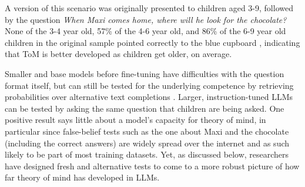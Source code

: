 \noindent
A version of this scenario was originally presented to children aged 3-9, followed by the question {\em When Maxi comes home, where will he look for the chocolate?} None of the 3-4 year old, 57\% of the 4-6 year old, and 86\% of the 6-9 year old children in the original sample pointed correctly to the blue cupboard \citep{wimmer1983beliefs}, indicating that ToM is better developed as children get older, on average. 

Smaller and base models before fine-tuning have difficulties with the question format itself, but can still be tested for the underlying competence by retrieving probabilities over alternative text completions \citep{kouwenhoven2026traces}. Larger, instruction-tuned LLMs can be tested by asking the same question that children are being asked. 
One positive result says little about a model's capacity for theory of mind, in particular since false-belief tests such as the one about Maxi and the chocolate (including the correct answers) are widely spread over the internet and as such likely to be part of most training datasets. Yet, as discussed below, researchers have designed fresh and alternative tests to come to a more robust picture of how far theory of mind has developed in LLMs.


